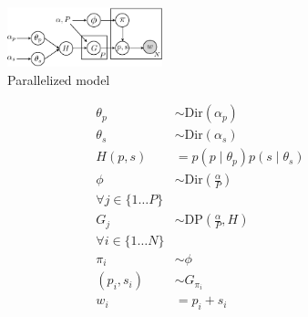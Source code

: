 \begin{figure}[h]
\centering
\includegraphics[width=0.4\textwidth]{fig/v3}
\caption{Parallelized model}
\label{fig:v1}
\end{figure}

\begin{align*}
\theta_p & \sim \text{Dir}(\alpha_p) \\
\theta_s & \sim \text{Dir}(\alpha_s) \\
H(p, s) & = p(p \mid \theta_p) p(s \mid \theta_s) \\
\phi & \sim \text{Dir}\left(\frac{\alpha}{P}\right) \\
\forall j \in \{1 \dots P\} \\
G_j & \sim \text{DP}\left(\frac{\alpha}{P}, H\right)\\
\forall i \in \{1 \dots N\} \\
\pi_i & \sim \phi \\
(p_i, s_i) & \sim G_{\pi_i} \\
w_i & = p_i+s_i
\end{align*}
